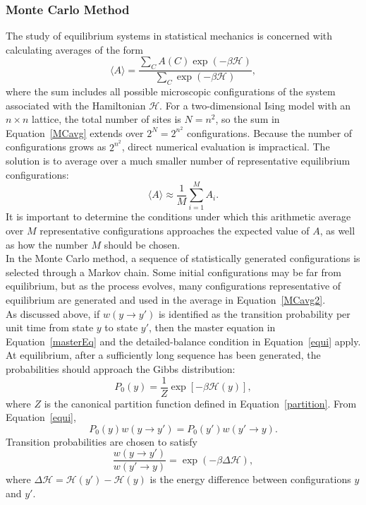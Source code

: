 \documentclass[a4paper]{article}
\begin{document}
\subsubsection{Monte Carlo Method}
The study of equilibrium systems in statistical mechanics is concerned with calculating averages of the form
\begin{equation}\label{MCavg}
\langle A\rangle=\frac{\displaystyle\sum_C A(C)\exp(-\beta\mathcal{H})}{\displaystyle\sum_C\exp(-\beta\mathcal{H})},
\end{equation}
where the sum includes all possible microscopic configurations of the system associated with the Hamiltonian $\mathcal{H}$. For a two-dimensional Ising model with an $n\times n$ lattice, the total number of sites is $N=n^2$, so the sum in Equation~\ref{MCavg} extends over $2^N=2^{n^2}$ configurations. Because the number of configurations grows as $2^{n^2}$, direct numerical evaluation is impractical. The solution is to average over a much smaller number of representative equilibrium configurations:
\begin{equation}\label{MCavg2}
\langle A\rangle\approx\frac{1}{M}\sum_{i=1}^{M}A_i.
\end{equation}
It is important to determine the conditions under which this arithmetic average over $M$ representative configurations approaches the expected value of $A$, as well as how the number $M$ should be chosen.\\

In the Monte Carlo method, a sequence of statistically generated configurations is selected through a Markov chain. Some initial configurations may be far from equilibrium, but as the process evolves, many configurations representative of equilibrium are generated and used in the average in Equation~\ref{MCavg2}.\\

As discussed above, if $w(y\rightarrow y')$ is identified as the transition probability per unit time from state $y$ to state $y'$, then the master equation in Equation~\ref{masterEq} and the detailed-balance condition in Equation~\ref{equi} apply.\\

At equilibrium, after a sufficiently long sequence has been generated, the probabilities should approach the Gibbs distribution:
\begin{equation}
P_0(y)=\frac{1}{Z}\exp[-\beta\mathcal{H}(y)],
\end{equation}
where $Z$ is the canonical partition function defined in Equation~\ref{partition}. From Equation~\ref{equi},
\begin{equation}
P_0(y)w(y\rightarrow y')=P_0(y')w(y'\rightarrow y).
\end{equation}
Transition probabilities are chosen to satisfy
\begin{equation}\label{probTans1}
\frac{w(y\rightarrow y')}{w(y'\rightarrow y)}=\exp(-\beta\Delta\mathcal{H}),
\end{equation}
where $\Delta\mathcal{H}=\mathcal{H}(y')-\mathcal{H}(y)$ is the energy difference between configurations $y$ and $y'$.\\
\end{document}
